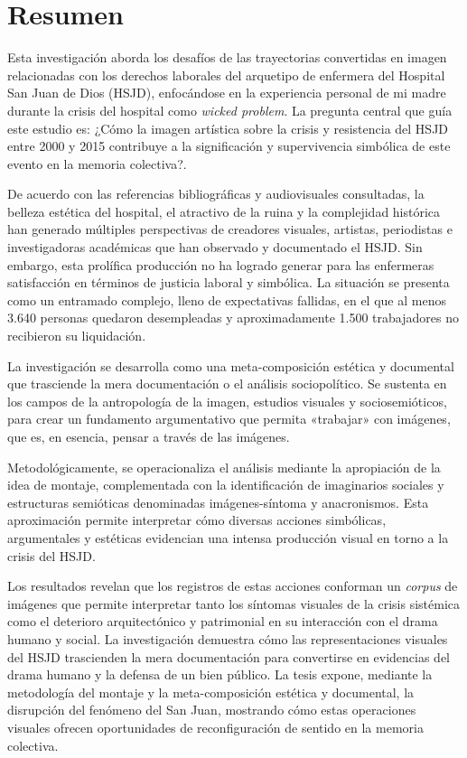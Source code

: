 \section*{Resumen}
\setlength{\parskip}{1em}

Esta investigación aborda los desafíos de las trayectorias convertidas en imagen relacionadas con los derechos laborales del arquetipo de enfermera del Hospital San Juan de Dios (HSJD), enfocándose en la experiencia personal de mi madre durante la crisis del hospital como \textit{wicked problem}. La pregunta central que guía este estudio es: ¿Cómo la imagen artística sobre la crisis y resistencia del HSJD entre 2000 y 2015 contribuye a la significación y supervivencia simbólica de este evento en la memoria colectiva?.

De acuerdo con las referencias bibliográficas y audiovisuales consultadas, la belleza estética del hospital, el atractivo de la ruina y la complejidad histórica han generado múltiples perspectivas de creadores visuales, artistas, periodistas e investigadoras académicas que han observado y documentado el HSJD. \textcolor{edit30sept}{Sin embargo, esta prolífica producción no ha logrado generar para las enfermeras satisfacción en términos de justicia laboral y simbólica. La situación se presenta como un entramado complejo, lleno de expectativas fallidas, en el que al menos 3.640 personas quedaron desempleadas y aproximadamente 1.500 trabajadores no recibieron su liquidación.}

La investigación se desarrolla como una meta-composición estética y documental que trasciende la mera documentación o el análisis sociopolítico. Se sustenta en los campos de la antropología de la imagen, estudios visuales y sociosemióticos, para crear un fundamento argumentativo que permita «trabajar» con imágenes, que es, en esencia, pensar a través de las imágenes.

Metodológicamente, se operacionaliza el análisis mediante la apropiación de la idea de montaje, complementada con la identificación de imaginarios sociales y estructuras semióticas denominadas imágenes-síntoma y anacronismos. Esta aproximación permite interpretar cómo diversas acciones simbólicas, argumentales y estéticas evidencian una intensa producción visual en torno a la crisis del HSJD.

Los resultados revelan que los registros de estas acciones conforman un \textcolor{edit30sept}{ \emph{corpus}} de imágenes que permite interpretar tanto los síntomas visuales de la crisis sistémica como el deterioro arquitectónico y patrimonial en su interacción con el drama humano y social. La investigación demuestra cómo las representaciones visuales del HSJD trascienden la mera documentación para convertirse en evidencias del drama humano y la defensa de un bien público. \textcolor{edit30sept}{La tesis expone, mediante la metodología del montaje y la meta-composición estética y documental, la disrupción del fenómeno del San Juan, mostrando cómo estas operaciones visuales ofrecen oportunidades de reconfiguración de sentido en la memoria colectiva.}

